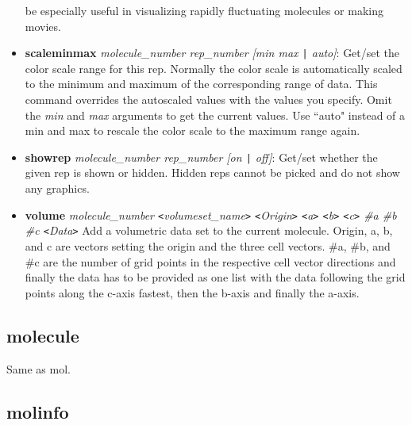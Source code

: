 \begin{itemize}
    be especially useful in visualizing rapidly fluctuating molecules or
    making movies.
    \item {\bf scaleminmax} {\it molecule\_number rep\_number [min max {\tt |} auto]}:
    Get/set the color scale range for this rep.  Normally the color scale
    is automatically scaled to the minimum and maximum of the corresponding
    range of data.  This command overrides the autoscaled values with the
    values you specify.  Omit the {\it min} and {\it max} arguments to get
    the current values.  Use ``auto" instead of a min and max to rescale the
    color scale to the maximum range again.
    \item {\bf showrep} {\it molecule\_number rep\_number [on {\tt |} off]}:
    Get/set whether the given rep is shown or hidden.  Hidden reps cannot
    be picked and do not show any graphics.
    \item {\bf volume} {\it molecule\_number {\tt <}volumeset\_name{\tt >} 
       {\tt <}Origin{\tt >}  {\tt <}a{\tt >}  {\tt <}b{\tt >}  {\tt <}c{\tt >}
        \#a \#b \#c  {\tt <}Data{\tt >} }
   Add a volumetric data set to the current molecule. Origin, a, b, and c are 
   vectors setting the origin and the three cell vectors. \#a, \#b, and \#c
   are the number of grid points in the respective cell vector directions and
   finally the data has to be provided as one list with the data following the 
   grid points along the c-axis fastest, then the b-axis and finally the a-axis.
  \end{itemize}


  \subsection{molecule}
Same as mol.

\subsection{molinfo}
\label{ug:topic:molinfo}

